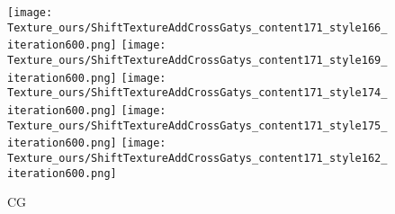 \documentclass[runningheads]{llncs}
\begin{document}
\begin{figure*}[!htbp]
\begin{subfigure}[t]{0.15\textwidth}
	\texttt{[image: Texture\_ours/ShiftTextureAddCrossGatys\_content171\_style166\_iteration600.png]}
	\texttt{[image: Texture\_ours/ShiftTextureAddCrossGatys\_content171\_style169\_iteration600.png]}
	\texttt{[image: Texture\_ours/ShiftTextureAddCrossGatys\_content171\_style174\_iteration600.png]}
	\texttt{[image: Texture\_ours/ShiftTextureAddCrossGatys\_content171\_style175\_iteration600.png]}
    \texttt{[image: Texture\_ours/ShiftTextureAddCrossGatys\_content171\_style162\_iteration600.png]}
    \caption{CG}
\end{subfigure}
\begin{subfigure}[t]{0.15\textwidth}


\end{subfigure}
\end{figure*}
\end{document}
